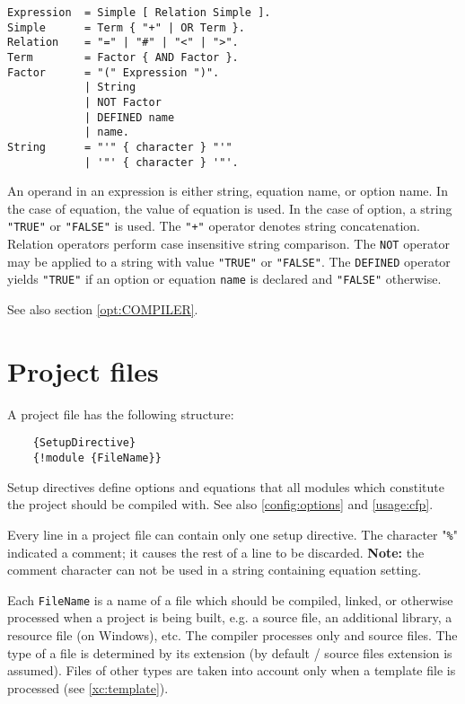 \begin{verbatim}
Expression  = Simple [ Relation Simple ].
Simple      = Term { "+" | OR Term }.
Relation    = "=" | "#" | "<" | ">".
Term        = Factor { AND Factor }.
Factor      = "(" Expression ")".
            | String
            | NOT Factor
            | DEFINED name
            | name.
String      = "'" { character } "'"
            | '"' { character } '"'.
\end{verbatim}

An operand in an expression is either string, equation name, or option
name. In the case of equation, the value of equation is used. In the
case of option, a string \verb'"TRUE"' or \verb'"FALSE"' is used.
The \verb'"+"' operator denotes string concatenation.
Relation operators perform case insensitive string comparison.
The \verb'NOT' operator may be applied to a string with value
\verb'"TRUE"' or \verb'"FALSE"'. The \verb'DEFINED' operator yields \verb'"TRUE"' if
an option or equation \verb'name' is declared and \verb'"FALSE"' otherwise.

See also section \ref{opt:COMPILER}.

\section{Project files}\label{xc:project}

A project file has the following structure:

\verb'    {SetupDirective}' \\
\verb'    {!module {FileName}}'

Setup directives define options and equations that all modules
which constitute the project should be compiled with.
See also \ref{config:options} and \ref{usage:cfp}.

Every line in a project file can contain only one setup directive. The
character "\verb|%|" indicated a comment; it causes the rest of
a line to be discarded. {\bf Note:} the comment character can not be
used in a string containing equation setting.

Each  {\tt FileName} is a name of a file which should be compiled,
linked, or otherwise processed when a project is being built, e.g.
a source file, an additional library, a resource file (on Windows),
etc. The compiler processes only \mt{} and \ot{}
source files. The type of a file is determined by its extension
(by default \mt{}/\ot{} source files extension is assumed).
Files of other types are taken into account only when a template file
is processed (see \ref{xc:template}).

